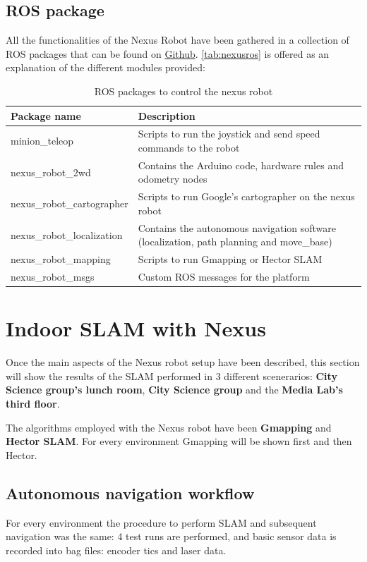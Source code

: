 \subsection{ROS package}
All the functionalities of the Nexus Robot have been gathered in a collection of ROS packages that can be found on \href{https://github.com/yagoliz/nexus_robot_autonomous_navigation}{Github}. \autoref{tab:nexusros} is offered as an explanation of the different modules provided:
\begin{table}[h]
  \centering
  \begin{tabular}{lp{7cm}}
  \hline
  \textbf{Package name} & \textbf{Description} \\ \hline
  minion\_teleop & Scripts to run the joystick and send speed commands to the robot \\ \hline
  nexus\_robot\_2wd & Contains the Arduino code, hardware rules and odometry nodes \\ \hline
  nexus\_robot\_cartographer & Scripts to run Google's cartographer on the nexus robot \\ \hline
  nexus\_robot\_localization & Contains the autonomous navigation software (localization, path planning and move\_base) \\ \hline
  nexus\_robot\_mapping & Scripts to run Gmapping or Hector SLAM \\ \hline
  nexus\_robot\_msgs & Custom ROS messages for the platform \\ \hline
  \end{tabular}
  \caption{ROS packages to control the nexus robot}
  \label{tab:nexusros}
  \end{table}

\section{Indoor SLAM with Nexus}

Once the main aspects of the Nexus robot setup have been described, this section will show the results of the SLAM performed in 3 different scenerarios: \textbf{City Science group's lunch room}, \textbf{City Science group} and the \textbf{Media Lab's third floor}.

The algorithms employed with the Nexus robot have been \textbf{Gmapping} and \textbf{Hector SLAM}. For every environment Gmapping will be shown first and then Hector.

\subsection{Autonomous navigation workflow}
For every environment the procedure to perform SLAM and subsequent navigation was the same: 4 test runs are performed, and basic sensor data is recorded into bag files: encoder tics and laser data.  

